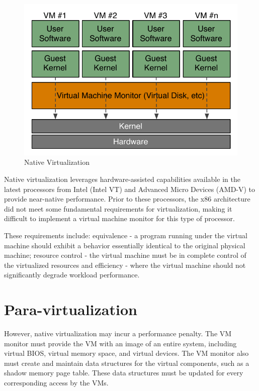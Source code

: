 \begin{figure}[H]
	\center
	\includegraphics[scale=0.75]{intro/native-virtualization}
	\caption{Native Virtualization}
\end{figure}

Native virtualization leverages hardware-assisted capabilities available in the
latest processors from Intel (Intel VT) and Advanced Micro Devices (AMD-V) to
provide near-native performance. Prior to these processors, the x86
architecture did not meet some fundamental requirements for virtualization,
making it difficult to implement a virtual machine monitor for this type of
processor.

These requirements include: equivalence - a program running under the virtual
machine should exhibit a behavior essentially identical to the original
physical machine; resource control - the virtual machine must be in complete
control of the virtualized resources and efficiency - where the virtual machine
should not significantly degrade workload performance.~\cite{wp-native-virt}

\section{Para-virtualization}
\label{sec:intro:intro:para}

However, native virtualization may incur a performance penalty.  The VM monitor
must provide the VM with an image of an entire system, including virtual BIOS,
virtual memory space, and virtual devices. The VM monitor also must create and
maintain data structures for the virtual components, such as a shadow memory
page table. These data structures must be updated for every corresponding
access by the VMs.

